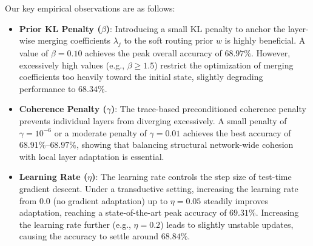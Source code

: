 \documentclass{article}
\theoremstyle{definition}
\theoremstyle{remark}
\begin{document}
Our key empirical observations are as follows:
\begin{itemize}
    \item \textbf{Prior KL Penalty ($\beta$)}: Introducing a small KL penalty to anchor the layer-wise merging coefficients $\lambda_j$ to the soft routing prior $w$ is highly beneficial. A value of $\beta = 0.10$ achieves the peak overall accuracy of $68.97\%$. However, excessively high values (e.g., $\beta \ge 1.5$) restrict the optimization of merging coefficients too heavily toward the initial state, slightly degrading performance to $68.34\%$.
    \item \textbf{Coherence Penalty ($\gamma$)}: The trace-based preconditioned coherence penalty prevents individual layers from diverging excessively. A small penalty of $\gamma = 10^{-6}$ or a moderate penalty of $\gamma = 0.01$ achieves the best accuracy of $68.91\%$--$68.97\%$, showing that balancing structural network-wide cohesion with local layer adaptation is essential.
    \item \textbf{Learning Rate ($\eta$)}: The learning rate controls the step size of test-time gradient descent. Under a transductive setting, increasing the learning rate from $0.0$ (no gradient adaptation) up to $\eta = 0.05$ steadily improves adaptation, reaching a state-of-the-art peak accuracy of $69.31\%$. Increasing the learning rate further (e.g., $\eta = 0.2$) leads to slightly unstable updates, causing the accuracy to settle around $68.84\%$.
\end{itemize}
\end{document}
